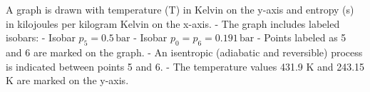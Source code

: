 A graph is drawn with temperature (T) in Kelvin on the y-axis and entropy (s) in kilojoules per kilogram Kelvin on the x-axis.  
- The graph includes labeled isobars:  
  - Isobar \( p_5 = 0.5 \, \text{bar} \)  
  - Isobar \( p_0 = p_6 = 0.191 \, \text{bar} \)  
- Points labeled as 5 and 6 are marked on the graph.  
- An isentropic (adiabatic and reversible) process is indicated between points 5 and 6.  
- The temperature values 431.9 K and 243.15 K are marked on the y-axis.